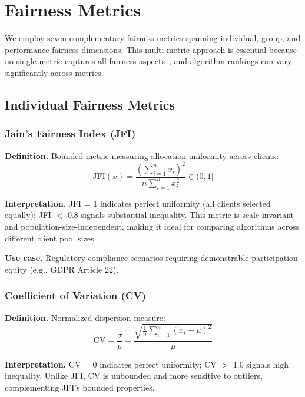 \documentclass{article}
\begin{document}
\section{Fairness Metrics}

We employ seven complementary fairness metrics spanning individual, group, and performance fairness dimensions. This multi-metric approach is essential because no single metric captures all fairness aspects~\cite{ezzeldin2021fedfair}, and algorithm rankings can vary significantly across metrics.

\subsection{Individual Fairness Metrics}

\subsubsection{Jain's Fairness Index (JFI)}

\textbf{Definition.} Bounded metric measuring allocation uniformity across clients:
\begin{equation}
\text{JFI}(x) = \frac{\left(\sum_{i=1}^{n} x_i\right)^2}{n \sum_{i=1}^{n} x_i^2} \in (0, 1]
\end{equation}

\textbf{Interpretation.} JFI = 1 indicates perfect uniformity (all clients selected equally); JFI $<$ 0.8 signals substantial inequality. This metric is scale-invariant and population-size-independent, making it ideal for comparing algorithms across different client pool sizes.

\textbf{Use case.} Regulatory compliance scenarios requiring demonstrable participation equity (e.g., GDPR Article 22).

\subsubsection{Coefficient of Variation (CV)}

\textbf{Definition.} Normalized dispersion measure:
\begin{equation}
\text{CV} = \frac{\sigma}{\mu} = \frac{\sqrt{\frac{1}{n}\sum_{i=1}^n (x_i - \mu)^2}}{\mu}
\end{equation}

\textbf{Interpretation.} CV = 0 indicates perfect uniformity; CV $>$ 1.0 signals high inequality. Unlike JFI, CV is unbounded and more sensitive to outliers, complementing JFI's bounded properties.
\end{document}
